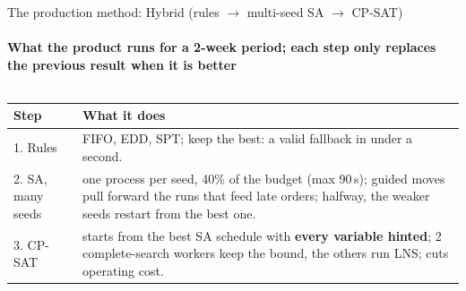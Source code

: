 \begin{frame}{The production method: Hybrid (rules $\to$ multi-seed SA $\to$ CP-SAT)}
\framesubtitle{What the product runs for a 2-week period; each step only replaces the previous result when it is better}
\begin{columns}[T]
\begin{column}{0.5\textwidth}
\tiny
\begin{tabular}{@{}L{1.25cm}L{5.4cm}@{}}
\toprule
Step & What it does\\
. Rules & FIFO, EDD, SPT; keep the best: a valid fallback in under a second.\\
2. SA, many seeds & one process per seed, 40\% of the budget (max 90\,s); guided moves pull forward the runs that feed late orders; halfway, the weaker seeds restart from the best one.\\
3. CP-SAT & starts from the best SA schedule with \textbf{every variable hinted}; 2 complete-search workers keep the bound, the others run LNS; cuts operating cost.\\
\bottomrule
\end{tabular}
\vspace{0.5em}


\end{column}
\end{columns}
\end{frame}
